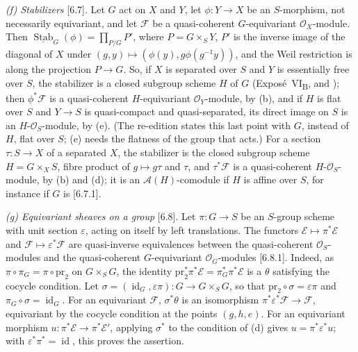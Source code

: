 \par\smallskip\noindent\textit{(f) Stabilizers} [6.7].
Let \(G\) act on \(X\) and \(Y\), let \(\phi:Y\to X\) be an \(S\)-morphism,
not necessarily equivariant, and let \(\mathscr F\) be a quasi-coherent
\(G\)-equivariant \(\mathcal O_X\)-module. Then
\(\underline{\operatorname{Stab}}_G(\phi)=\prod_{P/G}P'\), where
\(P=G\times_SY\), \(P'\) is the inverse image of the diagonal of \(X\) under
\((g,y)\mapsto(\phi(y),g\phi(g^{-1}y))\), and the Weil restriction is along
the projection \(P\to G\). So, if \(X\) is separated over \(S\) and \(Y\) is
essentially free over \(S\), the stabilizer is a closed subgroup scheme
\(H\) of \(G\) (Exposé~VI\textsubscript{B},  and ); then
\(\phi^*\mathscr F\) is a quasi-coherent \(H\)-equivariant
\(\mathcal O_Y\)-module, by (b), and if \(H\) is flat over \(S\) and
\(Y\to S\) is quasi-compact and quasi-separated, its direct image on \(S\)
is an \(H\)-\(\mathcal O_S\)-module, by (e). (The re-edition states this last
point with \(G\), instead of \(H\), flat over \(S\); (e) needs the flatness
of the group that acts.) For a section \(\tau:S\to X\) of a separated
\(X\), the stabilizer is the closed subgroup scheme \(H=G\times_XS\), fibre
product of \(g\mapsto g\tau\) and \(\tau\), and \(\tau^*\mathscr F\) is a
quasi-coherent \(H\)-\(\mathcal O_S\)-module, by (b) and (d); it is an
\(\mathscr A(H)\)-comodule if \(H\) is affine over \(S\), for instance if
\(G\) is [6.7.1].

\par\smallskip\noindent{}\textit{(g) Equivariant sheaves on a group} [6.8].
Let \(\pi:G\to S\) be an \(S\)-group scheme with unit section
\(\varepsilon\), acting on itself by left translations.
The functors
\(\mathscr E\mapsto\pi^*\mathscr E\) and
\(\mathscr F\mapsto\varepsilon^*\mathscr F\) are quasi-inverse equivalences
between the quasi-coherent \(\mathcal O_S\)-modules and the quasi-coherent
\(G\)-equivariant \(\mathcal O_G\)-modules [6.8.1]. Indeed, as
\(\pi\circ\pi_G=\pi\circ\mathrm{pr}_2\) on \(G\times_SG\), the identity
\(\mathrm{pr}_2^*\pi^*\mathscr E=\pi_G^*\pi^*\mathscr E\) is a \(\theta\)
satisfying the cocycle condition. Let
\(\sigma=(\operatorname{id}_G,\varepsilon\pi):G\to G\times_SG\), so that
\(\mathrm{pr}_2\circ\sigma=\varepsilon\pi\) and
\(\pi_G\circ\sigma=\operatorname{id}_G\). For an equivariant \(\mathscr F\),
\(\sigma^*\theta\) is an isomorphism
\(\pi^*\varepsilon^*\mathscr F\to\mathscr F\), equivariant by the cocycle
condition at the points \((g,h,e)\). For an equivariant morphism
\(u:\pi^*\mathscr E\to\pi^*\mathscr E'\), applying \(\sigma^*\) to the
condition of (d) gives \(u=\pi^*\varepsilon^*u\); with
\(\varepsilon^*\pi^*=\operatorname{id}\), this proves the assertion.


